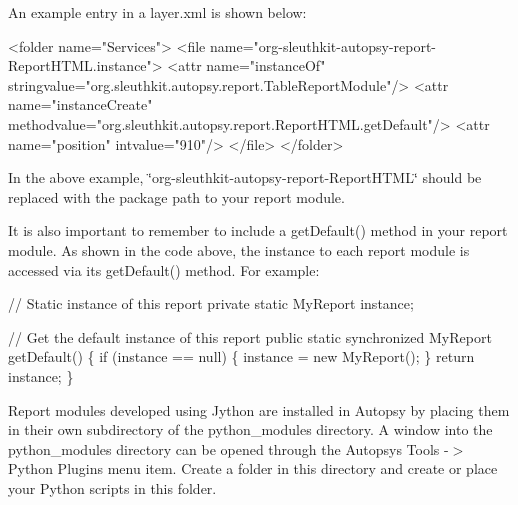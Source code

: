 An example entry in a layer.\+xml is shown below\+: 
\begin{DoxyCode}
<folder name=\textcolor{stringliteral}{"Services"}>
    <file name=\textcolor{stringliteral}{"org-sleuthkit-autopsy-report-ReportHTML.instance"}>
        <attr name=\textcolor{stringliteral}{"instanceOf"} stringvalue=\textcolor{stringliteral}{"org.sleuthkit.autopsy.report.TableReportModule"}/>
        <attr name=\textcolor{stringliteral}{"instanceCreate"} methodvalue=\textcolor{stringliteral}{"org.sleuthkit.autopsy.report.ReportHTML.getDefault"}/>
        <attr name=\textcolor{stringliteral}{"position"} intvalue=\textcolor{stringliteral}{"910"}/>
    </file>
</folder>
\end{DoxyCode}


In the above example, \char`\"{}org-\/sleuthkit-\/autopsy-\/report-\/\+Report\+H\+T\+M\+L\char`\"{} should be replaced with the package path to your report module.

It is also important to remember to include a get\+Default() method in your report module. As shown in the code above, the instance to each report module is accessed via it\textquotesingle{}s get\+Default() method. For example\+:


\begin{DoxyCode}
\textcolor{comment}{// Static instance of this report}
\textcolor{keyword}{private} \textcolor{keyword}{static} MyReport instance;

\textcolor{comment}{// Get the default instance of this report}
\textcolor{keyword}{public} \textcolor{keyword}{static} \textcolor{keyword}{synchronized} MyReport getDefault() \{
    \textcolor{keywordflow}{if} (instance == null) \{
        instance = \textcolor{keyword}{new} MyReport();
    \}
    \textcolor{keywordflow}{return} instance;
\}
\end{DoxyCode}


Report modules developed using Jython are installed in Autopsy by placing them in their own subdirectory of the python\+\_\+modules directory. A window into the python\+\_\+modules directory can be opened through the Autopsy\textquotesingle{}s Tools -\/$>$ Python Plugins menu item. Create a folder in this directory and create or place your Python scripts in this folder. 